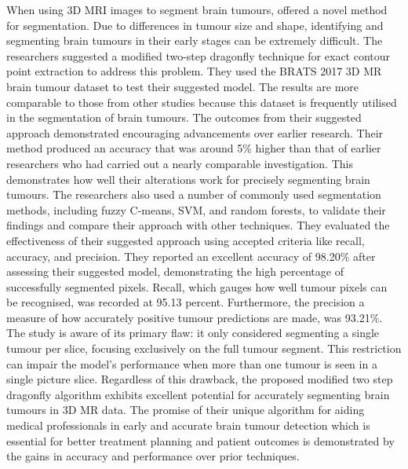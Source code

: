 \documentclass[12pt, a4paper,twoside]{report}
\theoremstyle{plain} %
\theoremstyle{definition} %
\theoremstyle{remark} %
\numberwithin{equation}{chapter}
\begin{document}
When using 3D MRI images to segment brain tumours, \cite{khalil20} offered a novel method for segmentation. Due to differences in tumour size and shape, identifying and segmenting brain tumours in their early stages can be extremely difficult. The researchers suggested a modified two-step dragonfly technique for exact contour point extraction to address this problem. They used the BRATS 2017 3D MR brain tumour dataset to test their suggested model. The results are more comparable to those from other studies because this dataset is frequently utilised in the segmentation of brain tumours. The outcomes from their suggested approach demonstrated encouraging advancements over earlier research. Their method produced an accuracy that was around 5\% higher than that of earlier researchers who had carried out a nearly comparable investigation. This demonstrates how well their alterations work for precisely segmenting brain tumours. The researchers also used a number of commonly used segmentation methods, including fuzzy C-means, SVM, and random forests, to validate their findings and compare their approach with other techniques. They evaluated the effectiveness of their suggested approach using accepted criteria like recall, accuracy, and precision. They reported an excellent accuracy of 98.20\% after assessing their suggested model, demonstrating the high percentage of successfully segmented pixels. Recall, which gauges how well tumour pixels can be recognised, was recorded at 95.13 percent. Furthermore, the precision a measure of how accurately positive tumour predictions are made, was 93.21\%. The study is aware of its primary flaw: it only considered segmenting a single tumour per slice, focusing exclusively on the full tumour segment. This restriction can impair the model's performance when more than one tumour is seen in a single picture slice. Regardless of this drawback, the proposed modified two step dragonfly algorithm exhibits excellent potential for accurately segmenting brain tumours in 3D MR data. The promise of their unique algorithm for aiding medical professionals in early and accurate brain tumour detection which is essential for better treatment planning and patient outcomes is demonstrated by the gains in accuracy and performance over prior techniques. 
\end{document}
